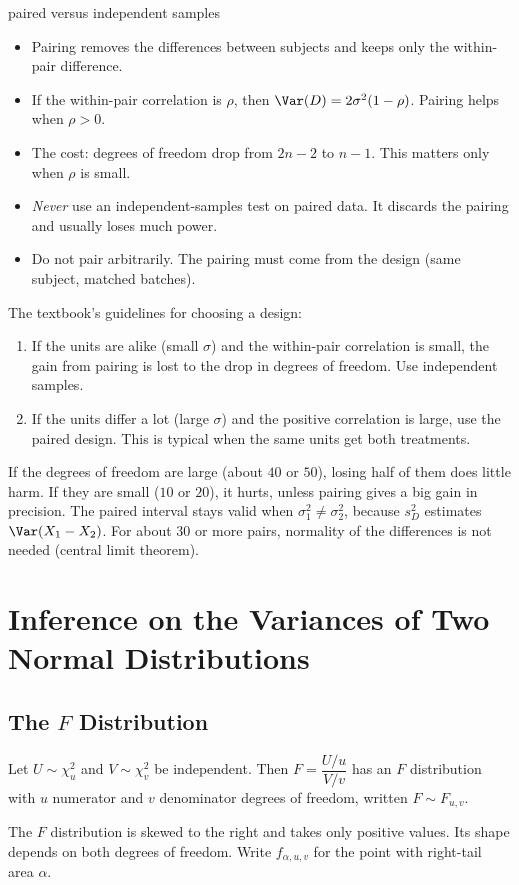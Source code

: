 \begin{interview}{paired versus independent samples}
\begin{itemize}
  \item Pairing removes the differences between subjects and keeps only the within-pair difference.
  \item If the within-pair correlation is $\rho$, then $\Var(D)=2\sigma^2(1-\rho)$. Pairing helps when $\rho>0$.
  \item The cost: degrees of freedom drop from $2n-2$ to $n-1$. This matters only when $\rho$ is small.
  \item \emph{Never} use an independent-samples test on paired data. It discards the pairing and usually loses much power.
  \item Do not pair arbitrarily. The pairing must come from the design (same subject, matched batches).
\end{itemize}
\end{interview}

The textbook's guidelines for choosing a design:
\begin{enumerate}
  \item If the units are alike (small $\sigma$) and the within-pair correlation is small, the gain from pairing is lost to the drop in degrees of freedom. Use independent samples.
  \item If the units differ a lot (large $\sigma$) and the positive correlation is large, use the paired design. This is typical when the same units get both treatments.
\end{enumerate}
If the degrees of freedom are large (about $40$ or $50$), losing half of them does little harm. If they are small ($10$ or $20$), it hurts, unless pairing gives a big gain in precision. The paired interval stays valid when $\sigma_1^2\ne\sigma_2^2$, because $s_D^2$ estimates $\Var(X_1-X_2)$. For about $30$ or more pairs, normality of the differences is not needed (central limit theorem).

\section{Inference on the Variances of Two Normal Distributions}\label{sec:ftest}

\subsection{The $F$ Distribution}

\begin{definition}[$F$ distribution]
Let $U\sim\chi^2_u$ and $V\sim\chi^2_v$ be independent. Then $F=\dfrac{U/u}{V/v}$ has an $F$ distribution with $u$ numerator and $v$ denominator degrees of freedom, written $F\sim F_{u,v}$.

The $F$ distribution is skewed to the right and takes only positive values. Its shape depends on both degrees of freedom. Write $f_{\alpha,u,v}$ for the point with right-tail area $\alpha$.
\end{definition}

